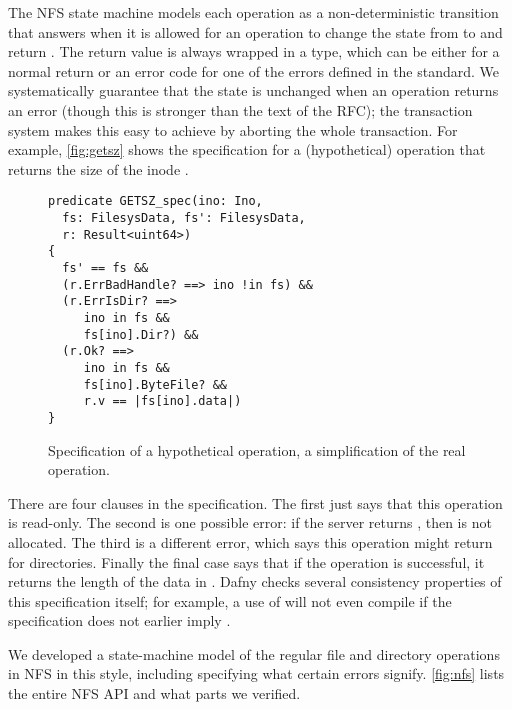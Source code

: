 
The NFS state machine models each operation as a non-deterministic transition
that answers when it is allowed for an operation to change the state from
 to  and return . The return value is always wrapped in a
 type, which can be either  for a normal return or an error
code for one of the errors defined in the standard. We systematically guarantee
that the state is unchanged when an operation returns an error (though this is
stronger than the text of the RFC); the transaction system makes this easy to
achieve by aborting the whole transaction. For example,
\autoref{fig:getsz} shows the
specification for a (hypothetical)  operation that returns the size of
the inode .

\begin{figure}
\begin{verbatim}
predicate GETSZ_spec(ino: Ino,
  fs: FilesysData, fs': FilesysData,
  r: Result<uint64>)
{
  fs' == fs &&
  (r.ErrBadHandle? ==> ino !in fs) &&
  (r.ErrIsDir? ==>
     ino in fs &&
     fs[ino].Dir?) &&
  (r.Ok? ==>
     ino in fs &&
     fs[ino].ByteFile? &&
     r.v == |fs[ino].data|)
}
\end{verbatim}
\caption{Specification of a hypothetical  operation, a simplification
  of the real  operation.}
\label{fig:getsz}
\end{figure}

There are four clauses in the specification. The first just says that this
operation is read-only. The second is one possible error: if the server returns
, then  is not allocated. The third is a different
error, which says this operation might return  for directories.
Finally the final case says that if the operation is successful, it returns the
length of the data in . Dafny checks several consistency properties
of this specification itself; for example, a use of  will not even
compile if the specification does not earlier imply .

We developed a state-machine model of the regular file and directory operations
in NFS in this style, including specifying what certain errors
signify. \autoref{fig:nfs} lists the entire NFS API and what parts we verified.

